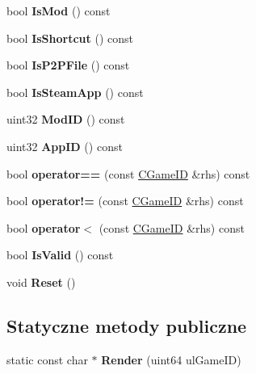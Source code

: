 \begin{DoxyCompactItemize}
\mbox{\label{class_c_game_i_d_abfea679e850e0957e78dd3ff543f4db6}} 
bool {\bfseries Is\+Mod} () const
\item 
\mbox{\label{class_c_game_i_d_a0d58cb3c2058accacc6abd59ecffa922}} 
bool {\bfseries Is\+Shortcut} () const
\item 
\mbox{\label{class_c_game_i_d_a4069c44d90ed88a4654f89e25fbd9099}} 
bool {\bfseries Is\+P2\+P\+File} () const
\item 
\mbox{\label{class_c_game_i_d_af4e23eec5fb4e2a03462d3cf489d609f}} 
bool {\bfseries Is\+Steam\+App} () const
\item 
\mbox{\label{class_c_game_i_d_a7318642ca91f5256644e4f1cb857c093}} 
uint32 {\bfseries Mod\+ID} () const
\item 
\mbox{\label{class_c_game_i_d_a40f275798606732a40f6e91de07b45a7}} 
uint32 {\bfseries App\+ID} () const
\item 
\mbox{\label{class_c_game_i_d_a9b82acf2f9a14feed24a7c75a1892dee}} 
bool {\bfseries operator==} (const \hyperlink{class_c_game_i_d}{C\+Game\+ID} \&rhs) const
\item 
\mbox{\label{class_c_game_i_d_ad427272aaad62fb7b953d70effa77190}} 
bool {\bfseries operator!=} (const \hyperlink{class_c_game_i_d}{C\+Game\+ID} \&rhs) const
\item 
\mbox{\label{class_c_game_i_d_a876820cbbd7d1192a55654105bd7d855}} 
bool {\bfseries operator$<$} (const \hyperlink{class_c_game_i_d}{C\+Game\+ID} \&rhs) const
\item 
\mbox{\label{class_c_game_i_d_a23db2be3880be463047b5bac8791e6cc}} 
bool {\bfseries Is\+Valid} () const
\item 
\mbox{\label{class_c_game_i_d_aa9cc9ed21dcbcaa0d353d606e29d08ab}} 
void {\bfseries Reset} ()
\end{DoxyCompactItemize}
\subsection*{Statyczne metody publiczne}
\begin{DoxyCompactItemize}
\item 
\mbox{\label{class_c_game_i_d_a533b90c809f2cc984527a5c0a0cecca0}} 
static const char $\ast$ {\bfseries Render} (uint64 ul\+Game\+ID)
\end{DoxyCompactItemize}


